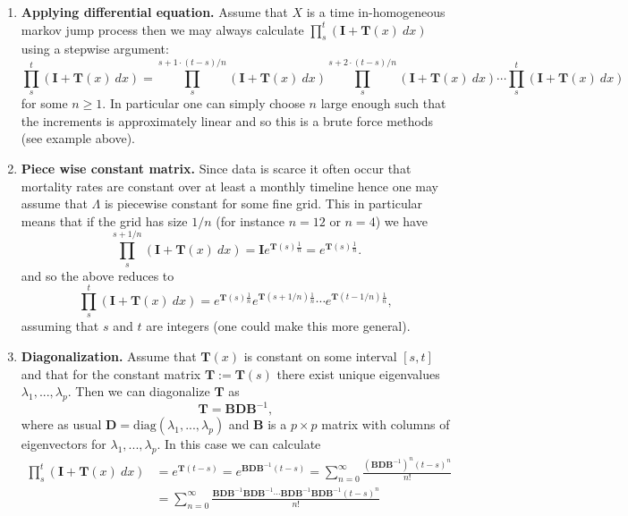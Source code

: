 \documentclass[a4paper,12pt,openany]{book}
\providecommand{\tightlist}{%
 \setlength{\itemsep}{0pt}\setlength{\parskip}{0pt}}
\begin{document}
\begin{enumerate}
\def\labelenumi{\arabic{enumi}.}
\tightlist
\item
  \textbf{Applying differential equation.} Assume that \(X\) is a time in-homogeneous markov jump process then we may always calculate \(\prod_s^t(\mathbf I + \mathbf T(x)\ dx)\) using a stepwise argument:
  \[
    \prod_s^t(\mathbf I + \mathbf T(x)\ dx)=\prod_s^{s+1\cdot (t-s)/n}(\mathbf I + \mathbf T(x)\ dx)\prod_s^{s+2\cdot (t-s)/n}(\mathbf I + \mathbf T(x)\ dx)\cdots\prod_s^{t}(\mathbf I + \mathbf T(x)\ dx)
    \]
  for some \(n\ge 1\). In particular one can simply choose \(n\) large enough such that the increments is approximately linear and so this is a brute force methods (see example above).
\item
  \textbf{Piece wise constant matrix.} Since data is scarce it often occur that mortality rates are constant over at least a monthly timeline hence one may assume that \(\Lambda\) is piecewise constant for some fine grid. This in particular means that if the grid has size \(1/n\) (for instance \(n=12\) or \(n=4\)) we have
  \[
    \prod_s^{s+1/n}(\mathbf I + \mathbf T(x)\ dx)=\mathbf{I}e^{\mathbf{T}(s)\frac{1}{n}}=e^{\mathbf{T}(s)\frac{1}{n}}.
    \]
  and so the above reduces to
  \[
    \prod_s^t(\mathbf I + \mathbf T(x)\ dx)=e^{\mathbf{T}(s)\frac{1}{n}}e^{\mathbf{T}(s+1/n)\frac{1}{n}}\cdots e^{\mathbf{T}(t-1/n)\frac{1}{n}},
    \]
  assuming that \(s\) and \(t\) are integers (one could make this more general).
\item
  \textbf{Diagonalization.} Assume that \(\mathbf{T}(x)\) is constant on some interval \([s,t]\) and that for the constant matrix \(\mathbf{T}:=\mathbf{T}(s)\) there exist unique eigenvalues \(\lambda_1,...,\lambda_p\). Then we can diagonalize \(\mathbf{T}\) as
  \[
    \mathbf{T}=\mathbf{B}\mathbf{D}\mathbf{B}^{-1},
    \]
  where as usual \(\mathbf{D}=\text{diag}(\lambda_1,...,\lambda_p)\) and \(\mathbf{B}\) is a \(p\times p\) matrix with columns of eigenvectors for \(\lambda_1,...,\lambda_p\). In this case we can calculate
  \begin{align*}
    \prod_s^t(\mathbf I + \mathbf T(x)\ dx)&=e^{\mathbf{T}(t-s)}=e^{\mathbf{B}\mathbf{D}\mathbf{B}^{-1}(t-s)}=\sum_{n=0}^\infty \frac{\left(\mathbf{B}\mathbf{D}\mathbf{B}^{-1}\right)^n(t-s)^n}{n!}\\
    &=\sum_{n=0}^\infty \frac{\mathbf{B}\mathbf{D}\mathbf{B}^{-1}\mathbf{B}\mathbf{D}\mathbf{B}^{-1}\cdots \mathbf{B}\mathbf{D}\mathbf{B}^{-1}\mathbf{B}\mathbf{D}\mathbf{B}^{-1}(t-s)^n}{n!}\\

\end{align*}
\end{enumerate}
\end{document}
